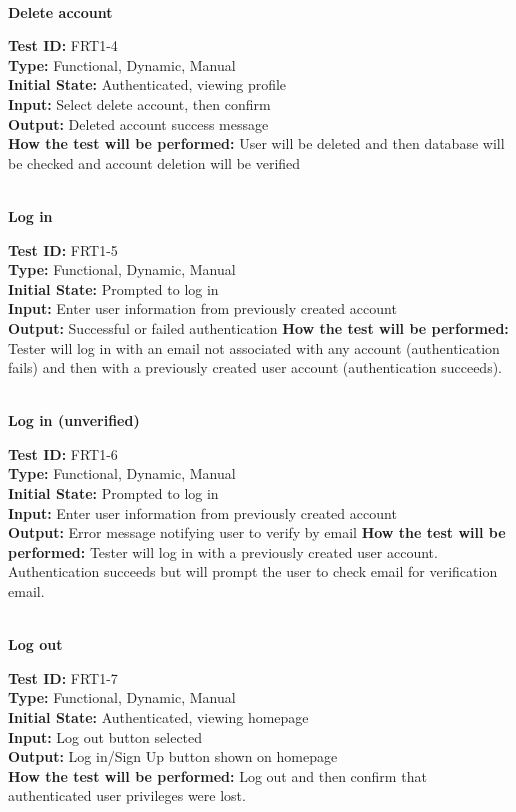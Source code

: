 \documentclass[12pt,fleqn]{article}
\begin{document}
\newpage

\textbf{\\Delete account}
\begin{tcolorbox}
\textbf{Test ID:} FRT1-4\\
\textbf{Type:} Functional, Dynamic, Manual\\
\textbf{Initial State:} Authenticated, viewing profile\\
\textbf{Input:} Select delete account, then confirm\\
\textbf{Output:} Deleted account success message\\
\textbf{How the test will be performed:} User will be deleted and then database will be checked and account deletion will be verified
\end{tcolorbox}

\textbf{\\Log in}
\begin{tcolorbox}
\textbf{Test ID:} FRT1-5\\
\textbf{Type:} Functional, Dynamic, Manual\\
\textbf{Initial State:} Prompted to log in\\
\textbf{Input:} Enter user information from previously created account\\
\textbf{Output:} Successful or failed authentication
\textbf{How the test will be performed:} Tester will log in with an email not associated with any account (authentication fails) and then with a previously created user account (authentication succeeds).
\end{tcolorbox}

\textbf{\\Log in (unverified)}
\begin{tcolorbox}
\textbf{Test ID:} FRT1-6\\
\textbf{Type:} Functional, Dynamic, Manual\\
\textbf{Initial State:} Prompted to log in\\
\textbf{Input:} Enter user information from previously created account\\
\textbf{Output:} Error message notifying user to verify by email
\textbf{How the test will be performed:} Tester will log in with a previously created user account. Authentication succeeds but will prompt the user to check email for verification email.
\end{tcolorbox}

\newpage

\textbf{\\Log out}
\begin{tcolorbox}
\textbf{Test ID:} FRT1-7\\
\textbf{Type:} Functional, Dynamic, Manual\\
\textbf{Initial State:} Authenticated, viewing homepage\\
\textbf{Input:} Log out button selected\\
\textbf{Output:} Log in/Sign Up button shown on homepage\\
\textbf{How the test will be performed:} Log out and then confirm that authenticated user privileges were lost.
\end{tcolorbox}
\end{document}
